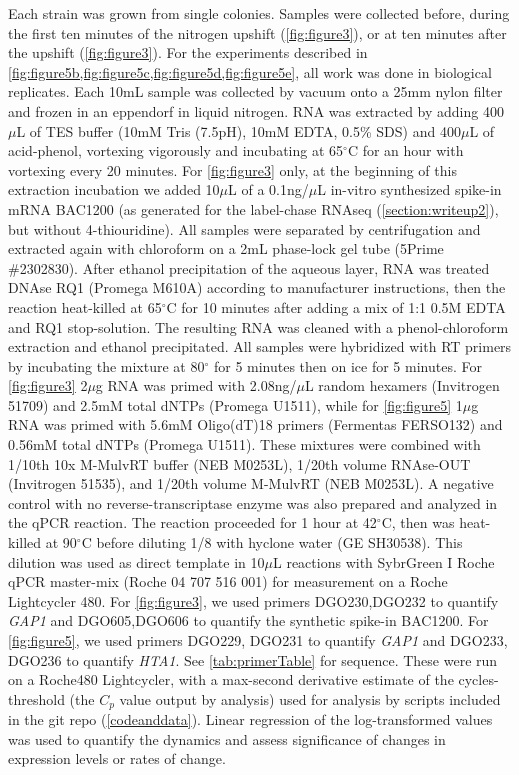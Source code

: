 Each strain was grown from single colonies.
Samples were collected before, during the first ten minutes of
the nitrogen upshift (\autoref{fig:figure3}),
or at ten minutes after the upshift (\autoref{fig:figure3}).
For the experiments described in
\autoref{fig:figure5b,fig:figure5c,fig:figure5d,fig:figure5e}, all work
was done in biological replicates.
Each 10mL sample was collected by vacuum onto a 25mm nylon filter
and frozen in an eppendorf in liquid nitrogen.
RNA was extracted by adding 400$\mu$L of TES buffer
(10mM Tris (7.5pH), 10mM EDTA, 0.5\% SDS)
and 400$\mu$L of acid-phenol, vortexing vigorously and incubating at 
65$^{\circ}$C for an hour with vortexing every 20 minutes. 
For \autoref{fig:figure3} only, at the beginning of this extraction incubation
we added 10$\mu$L of a 0.1ng/$\mu$L in-vitro synthesized spike-in 
mRNA BAC1200 (as generated
for the label-chase RNAseq (\autoref{section:writeup2}), 
but without 4-thiouridine). 
All samples were separated by centrifugation and extracted again 
with chloroform on a 2mL phase-lock gel tube (5Prime \#2302830). 
After ethanol precipitation of the aqueous layer, 
RNA was treated DNAse RQ1 (Promega M610A) according to manufacturer
instructions, then the reaction heat-killed at 65$^{\circ}$C for 
10 minutes after adding a mix of 1:1 0.5M EDTA and RQ1 stop-solution.
The resulting RNA was
cleaned with a phenol-chloroform extraction and ethanol 
precipitated.
All samples were hybridized with RT primers by incubating the mixture at 80$^{\circ}$ for 
5 minutes then on ice for 5 minutes.
For \autoref{fig:figure3} 2$\mu$g RNA was primed with 2.08ng/$\mu$L
random hexamers (Invitrogen 51709) and 
2.5mM total dNTPs (Promega U1511),
while for \autoref{fig:figure5} 1$\mu$g RNA was primed with 
5.6mM Oligo(dT)18 primers (Fermentas FERSO132) and
0.56mM total dNTPs (Promega U1511).
These mixtures were combined with 1/10th 10x M-MulvRT buffer (NEB M0253L), 
1/20th volume RNAse-OUT (Invitrogen 51535), and 1/20th volume M-MulvRT (NEB M0253L). 
A negative control with no reverse-transcriptase enzyme was also prepared
and analyzed in the qPCR reaction.
The reaction proceeded for 1 hour at 42$^{\circ}$C, 
then was heat-killed at 90$^{\circ}$C
before diluting 1/8 with hyclone water (GE SH30538). 
This dilution was used as direct
template in 10$\mu$L reactions with SybrGreen I Roche qPCR master-mix
(Roche 04 707 516 001) for measurement on a Roche Lightcycler 480. 
For \autoref{fig:figure3}, we used primers 
DGO230,DGO232 to quantify \textit{GAP1} and 
DGO605,DGO606 to quantify the synthetic spike-in BAC1200.
For \autoref{fig:figure5}, we used primers
DGO229, DGO231 to quantify \textit{GAP1} and
DGO233, DGO236 to quantify \textit{HTA1}.  
See \autoref{tab:primerTable} for sequence.
These were run on a Roche480 Lightcycler, 
with a max-second derivative estimate
of the cycles-threshold (the $C_p$ value output by analysis) used 
for analysis by scripts included in the git repo 
(\autoref{codeanddata}).
Linear regression of the log-transformed values was used to quantify
the dynamics and assess significance of changes in expression
levels or rates of change.

